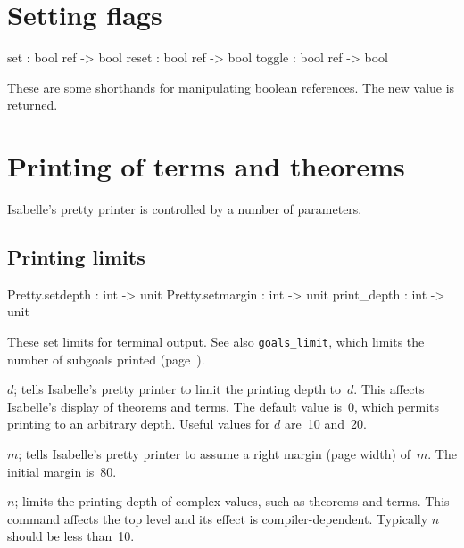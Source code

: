 \section{Setting flags}
\begin{ttbox}
set     : bool ref -> bool
reset   : bool ref -> bool
toggle  : bool ref -> bool
\end{ttbox}
These are some shorthands for manipulating boolean references. The new
value is returned.


\section{Printing of terms and theorems}\label{sec:printing-control}
Isabelle's pretty printer is controlled by a number of parameters.

\subsection{Printing limits}
\begin{ttbox} 
Pretty.setdepth  : int -> unit
Pretty.setmargin : int -> unit
print_depth      : int -> unit
\end{ttbox}
These set limits for terminal output.  See also {\tt goals_limit}, which
limits the number of subgoals printed (page~\pageref{sec:goals-printing}).

\begin{ttdescription}
\item[\ttindexbold{Pretty.setdepth} \(d\);]  
  tells Isabelle's pretty printer to limit the printing depth to~$d$.  This
  affects Isabelle's display of theorems and terms.  The default value
  is~0, which permits printing to an arbitrary depth.  Useful values for
  $d$ are~10 and~20.

\item[\ttindexbold{Pretty.setmargin} \(m\);]  
  tells Isabelle's pretty printer to assume a right margin (page width)
  of~$m$.  The initial margin is~80.

\item[\ttindexbold{print_depth} \(n\);]  
  limits the printing depth of complex \ML{} values, such as theorems and
  terms.  This command affects the \ML{} top level and its effect is
  compiler-dependent.  Typically $n$ should be less than~10.
\end{ttdescription}


